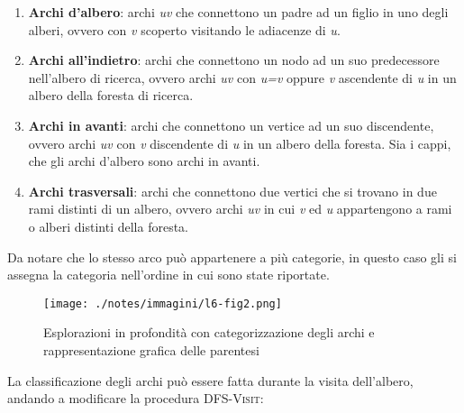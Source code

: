 \begin{enumerate}
\item
  \textbf{Archi d'albero}: archi \emph{uv} che connettono un padre ad un
  figlio in uno degli alberi, ovvero con \emph{v} scoperto visitando le
  adiacenze di \emph{u}.
\item
  \textbf{Archi all'indietro}: archi che connettono un nodo ad un suo
  predecessore nell'albero di ricerca, ovvero archi \emph{uv} con
  \emph{u=v} oppure \emph{v} ascendente di \emph{u} in un albero della
  foresta di ricerca.
\item
  \textbf{Archi in avanti}: archi che connettono un vertice ad un suo
  discendente, ovvero archi \emph{uv} con \emph{v} discendente di
  \emph{u} in un albero della foresta. Sia i cappi, che gli archi
  d'albero sono archi in avanti.
\item
  \textbf{Archi trasversali}: archi che connettono due vertici che si
  trovano in due rami distinti di un albero, ovvero archi \emph{uv} in
  cui \emph{v} ed \emph{u} appartengono a rami o alberi distinti della
  foresta.
\end{enumerate}

Da notare che lo stesso arco può appartenere a più categorie, in questo
caso gli si assegna la categoria nell'ordine in cui sono state
riportate.

\begin{figure}[htbp]
	\centering
	\texttt{[image: ./notes/immagini/l6-fig2.png]}
	\caption{Esplorazioni in profondità con categorizzazione degli archi e rappresentazione grafica delle parentesi}
\end{figure}

La classificazione degli archi può essere fatta durante la visita
dell'albero, andando a modificare la procedura \textsc{DFS-Visit}:

